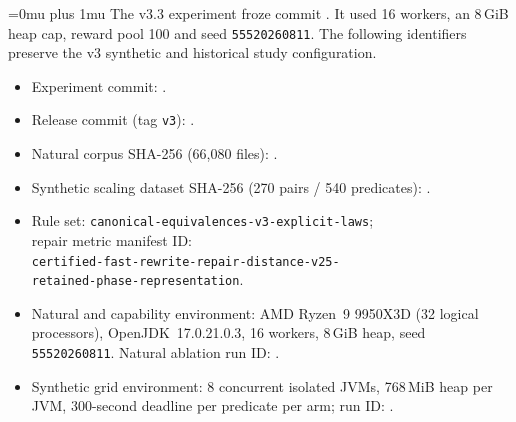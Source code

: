 \begingroup
\def\UrlBreaks{\do\-\do\_\do\/\do0\do1\do2\do3\do4\do5\do6\do7\do8\do9%
  \do\a\do\b\do\c\do\d\do\e\do\f}
\Urlmuskip=0mu plus 1mu\relax
The v3.3 experiment froze commit .
It used 16 workers, an 8\,GiB heap cap, reward pool 100 and seed
\texttt{55520260811}. The following identifiers preserve the v3 synthetic
and historical study configuration.
\begin{itemize}
\item Experiment commit: .
\item Release commit (tag \texttt{v3}): .
\item Natural corpus SHA-256 (66,080 files):
  .
\item Synthetic scaling dataset SHA-256 (270 pairs / 540 predicates):
  .
\item Rule set: \texttt{canonical-equivalences-v3-explicit-laws};\\
  repair metric manifest ID:\\
  \texttt{certified-fast-rewrite-repair-distance-v25-}\\
  \texttt{retained-phase-representation}.
\item Natural and capability environment: AMD Ryzen~9 9950X3D (32 logical
  processors), OpenJDK~17.0.21.0.3, 16 workers, 8\,GiB heap, seed
  \texttt{55520260811}. Natural ablation run ID:
  .
\item Synthetic grid environment: 8 concurrent isolated JVMs, 768\,MiB heap per
  JVM, 300-second deadline per predicate per arm; run ID:
  .
\end{itemize}
\endgroup
